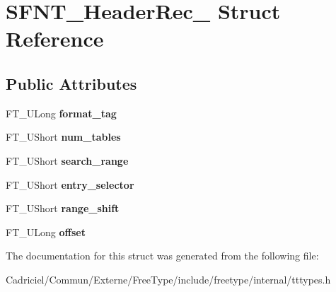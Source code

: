 \hypertarget{struct_s_f_n_t___header_rec__}{\section{S\-F\-N\-T\-\_\-\-Header\-Rec\-\_\- Struct Reference}
\label{struct_s_f_n_t___header_rec__}
}
\subsection*{Public Attributes}
\begin{DoxyCompactItemize}
\item 
\hypertarget{struct_s_f_n_t___header_rec___ad59d649b189ab19fae02341e95e02448}{F\-T\-\_\-\-U\-Long {\bfseries format\-\_\-tag}}\label{struct_s_f_n_t___header_rec___ad59d649b189ab19fae02341e95e02448}

\item 
\hypertarget{struct_s_f_n_t___header_rec___a46d8d8bf8f2d8b6536eb5fa5704852e2}{F\-T\-\_\-\-U\-Short {\bfseries num\-\_\-tables}}\label{struct_s_f_n_t___header_rec___a46d8d8bf8f2d8b6536eb5fa5704852e2}

\item 
\hypertarget{struct_s_f_n_t___header_rec___a39ca0e21eaec6be602547bb2ed898d5d}{F\-T\-\_\-\-U\-Short {\bfseries search\-\_\-range}}\label{struct_s_f_n_t___header_rec___a39ca0e21eaec6be602547bb2ed898d5d}

\item 
\hypertarget{struct_s_f_n_t___header_rec___ada628a85486eb034abd56b872ecdcd78}{F\-T\-\_\-\-U\-Short {\bfseries entry\-\_\-selector}}\label{struct_s_f_n_t___header_rec___ada628a85486eb034abd56b872ecdcd78}

\item 
\hypertarget{struct_s_f_n_t___header_rec___aa2a39db194a8a9a0cc8504143ac4f5c1}{F\-T\-\_\-\-U\-Short {\bfseries range\-\_\-shift}}\label{struct_s_f_n_t___header_rec___aa2a39db194a8a9a0cc8504143ac4f5c1}

\item 
\hypertarget{struct_s_f_n_t___header_rec___a04f99ce2ff335f8702a4edf7132a3e04}{F\-T\-\_\-\-U\-Long {\bfseries offset}}\label{struct_s_f_n_t___header_rec___a04f99ce2ff335f8702a4edf7132a3e04}

\end{DoxyCompactItemize}


The documentation for this struct was generated from the following file\-:\begin{DoxyCompactItemize}
\item 
Cadriciel/\-Commun/\-Externe/\-Free\-Type/include/freetype/internal/tttypes.\-h\end{DoxyCompactItemize}
